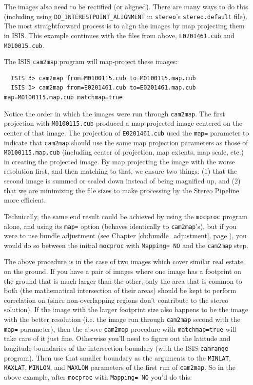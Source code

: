 The images also need to be rectified (or aligned).  There are many
ways to do this (including using \texttt{DO\_INTERESTPOINT\_ALIGNMENT}
in \texttt{stereo}'s \texttt{stereo.default} file).  The most
straightforward process is to align the images by map projecting
them in \ac{ISIS}. This example continues with the files from above,
\texttt{E0201461.cub} and \texttt{M010015.cub}.

The \ac{ISIS} \texttt{cam2map} program will map-project these images:

\begin{verbatim}
  ISIS 3> cam2map from=M0100115.cub to=M0100115.map.cub
  ISIS 3> cam2map from=E0201461.cub to=E0201461.map.cub map=M0100115.map.cub matchmap=true
\end{verbatim}

Notice the order in which the images were run through \texttt{cam2map}.
The first projection with \texttt{M0100115.cub} produced a map-projected
image centered on the center of that image.  The projection of
\texttt{E0201461.cub} used the \texttt{map=} parameter to indicate
that \texttt{cam2map} should use the same map projection parameters
as those of \texttt{M0100115.map.cub} (including center of projection,
map extents, map scale, etc.) in creating the projected image.  By
map projecting the image with the worse resolution first, and then
matching to that, we ensure two things: (1) that the second image
is summed or scaled down instead of being magnified up, and (2)
that we are minimizing the file sizes to make processing by the
Stereo Pipeline more efficient.

Technically, the same end result could be achieved by using the
\texttt{mocproc} program alone, and using its \texttt{map=} option
(behaves identically to \texttt{cam2map}'s), but if you were to use
bundle adjustment (see Chapter \ref{ch:bundle_adjustment}, page
\pageref{ch:bundle_adjustment}), you would do so between the initial
\texttt{mocproc} with \texttt{Mapping= NO} and the \texttt{cam2map}
step.

The above procedure is in the case of two images which cover similar
real estate on the ground.  If you have a pair of images where one
image has a footprint on the ground that is much larger than the
other, only the area that is common to both (the mathematical
intersection of their areas) should be kept to perform correlation
on (since non-overlapping regions don't contribute to the stereo
solution).  If the image with the larger footprint size also happens
to be the image with the better resolution (i.e. the image run through
\texttt{cam2map} second with the \texttt{map=} parameter), then the
above \texttt{cam2map} procedure with \texttt{matchmap=true} will take care
of it just fine.  Otherwise you'll need to figure out the latitude
and longitude boundaries of the intersection boundary 
(with the \ac{ISIS} \texttt{camrange} program).  Then use that smaller
boundary as the arguments to the \texttt{MINLAT}, \texttt{MAXLAT},
\texttt{MINLON}, and \texttt{MAXLON} parameters of the first run
of \texttt{cam2map}.  So in the above example, after \texttt{mocproc} with
\texttt{Mapping= NO} you'd do this:

